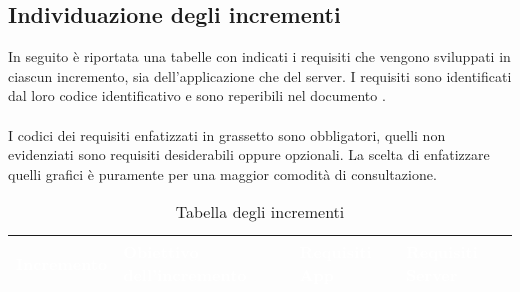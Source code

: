 \subsection{Individuazione degli incrementi}
In seguito è riportata una tabelle con indicati i requisiti che vengono sviluppati in ciascun incremento, sia dell'applicazione che del server.
I requisiti sono identificati dal loro codice identificativo e sono reperibili nel documento \AdR{}.\\
\\I codici dei requisiti enfatizzati in grassetto sono obbligatori, quelli non evidenziati sono requisiti desiderabili oppure opzionali.
La scelta di enfatizzare quelli grafici è puramente per una maggior comodità di consultazione.

{
\renewcommand{\arraystretch}{2}
\centering
	
\begin{longtable}{C{3cm} C{4cm} C{4cm} C{4cm}}
\caption{Tabella degli incrementi}\\
\textcolor{white}{\textbf{Incremento}} &
\textcolor{white}{\textbf{Obiettivo dell'incremento}} & 
\textcolor{white}{\textbf{Requisiti App}} &
\textcolor{white}{\textbf{Requisiti Server}}\\
\endhead


\end{longtable}}

